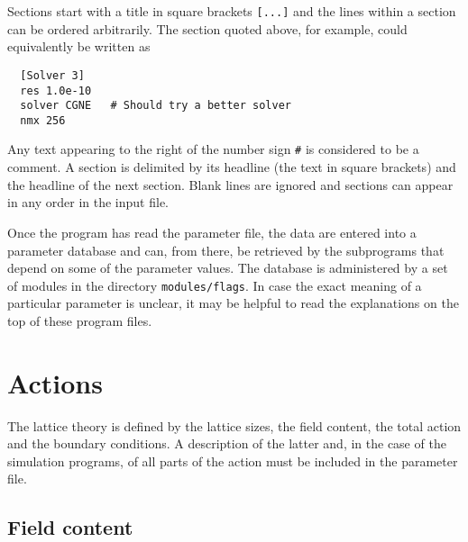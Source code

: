 \documentclass[11pt,fleqn]{article}
\begin{document}
Sections start with a title in square brackets \texttt{[...]} and the lines
within a section can be ordered arbitrarily. The section quoted above, for
example, could equivalently be written as
%
\begin{verbatim}
  [Solver 3]
  res 1.0e-10
  solver CGNE   # Should try a better solver
  nmx 256
\end{verbatim}
%
Any text appearing to the right of the number sign \texttt{\#} is considered to
be a comment. A section is delimited by its headline (the text in square
brackets) and the headline of the next section. Blank lines are ignored and
sections can appear in any order in the input file.

Once the program has read the parameter file, the data are entered into a
parameter database and can, from there, be retrieved by the subprograms that
depend on some of the parameter values. The database is administered by a set
of modules in the directory \texttt{modules/flags}. In case the exact meaning of
a particular parameter is unclear, it may be helpful to read the explanations on
the top of these program files.


\section{Actions}
\label{sec:actions}


The lattice theory is defined by the lattice sizes, the field content, the total
action and the boundary conditions. A description of the latter and, in the case
of the simulation programs, of all parts of the action must be included in the
parameter file.

\subsection{Field content}
\label{subsec:actions:fields}
\end{document}
